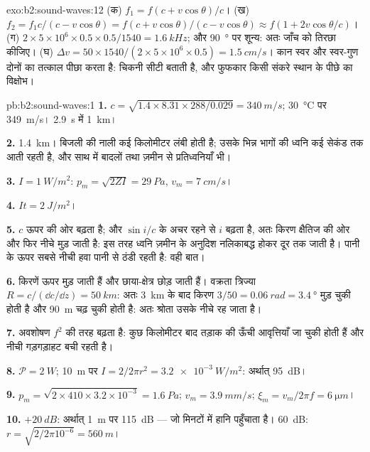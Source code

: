 \begin{solution}{exo:b2:sound-waves:12}
(क) $f_1 = f(c + v\cos\theta)/c$। (ख) $f_2 = f_1c/(c - v\cos\theta) = f(c + v\cos\theta)
/(c - v\cos\theta) \approx f(1 + 2v\cos\theta/c)$। (ग) $2 \times 5 \times 10^6 \times 0.5 \times 0.5/1540
= \qty{1.6}{kHz}$; और \qty{90}{\degree} पर शून्य: अतः जाँच को तिरछा कीजिए। (घ) $\Delta v = 50 \times 1540/
(2 \times 5 \times 10^6 \times 0.5) = \qty{1.5}{cm/s}$। कान स्वर और स्वर-गुण दोनों का
तत्काल पीछा करता है: चिकनी सीटी  बताती है, और फुफकार किसी संकरे स्थान के
पीछे का विक्षोभ।
\end{solution}

\begin{solution}{pb:b2:sound-waves:1}
\textbf{1.} $c = \sqrt{1.4 \times 8.31 \times 288/0.029} = \qty{340}{m/s}$; \qty{30}{\degreeCelsius}
पर \qty{349}{m/s}। \qty{2.9}{s} में \qty{1}{km}।

\textbf{2.} \qty{1.4}{km}। बिजली की नाली कई किलोमीटर लंबी होती है; उसके
भिन्न भागों की ध्वनि कई सेकंड तक आती रहती है, और साथ में बादलों तथा
ज़मीन से प्रतिध्वनियाँ भी।

\textbf{3.} $I = \qty{1}{W/m^2}$: $p_m = \sqrt{2ZI} = \qty{29}{Pa}$, $v_m = \qty{7}{cm/s}$।

\textbf{4.} $It = \qty{2}{J/m^2}$।

\textbf{5.} $c$ ऊपर की ओर बढ़ता है; और $\sin i/c$ के अचर रहने से $i$ बढ़ता है, अतः
किरण क्षैतिज की ओर और फिर नीचे मुड़ जाती है: इस तरह ध्वनि ज़मीन के
अनुदिश नलिकाबद्ध होकर दूर तक जाती है। पानी के ऊपर सबसे नीची हवा पानी से
ठंडी रहती है: वही बात।

\textbf{6.} किरणें ऊपर मुड़ जाती हैं और छाया-क्षेत्र छोड़ जाती हैं। वक्रता
त्रिज्या $R = c/(\dd c/\dd z) = \qty{50}{km}$: अतः \qty{3}{km} के बाद किरण
$3/50 = \qty{0.06}{rad} = \qty{3.4}{\degree}$ मुड़ चुकी होती है और \qty{90}{m} चढ़ चुकी होती है: अतः
श्रोता उसके नीचे रह जाता है।

\textbf{7.} अवशोषण $f^2$ की तरह बढ़ता है: कुछ किलोमीटर बाद तड़ाक की ऊँची
आवृत्तियाँ जा चुकी होती हैं और नीची गड़गड़ाहट बची रहती है।

\textbf{8.} $\mathcal P = \qty{2}{W}$; \qty{10}{m} पर $I = 2/2\pi r^2 = \qty{3.2e-3}{W/m^2}$:
अर्थात् \qty{95}{dB}।

\textbf{9.} $p_m = \sqrt{2 \times 410 \times 3.2 \times 10^{-3}} = \qty{1.6}{Pa}$; $v_m = \qty{3.9}{mm/s}$;
$\xi_m = v_m/2\pi f = \qty{6}{\micro m}$।

\textbf{10.} $+\qty{20}{dB}$: अर्थात् \qty{1}{m} पर \qty{115}{dB} --- जो मिनटों में
हानि पहुँचाता है। \qty{60}{dB}: $r = \sqrt{2/2\pi10^{-6}} = \qty{560}{m}$।


\end{solution}
